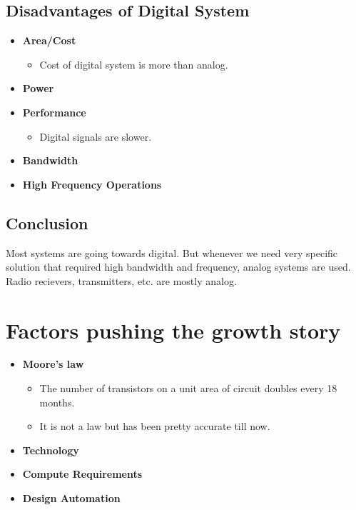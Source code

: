 \documentclass[oneside]{book}
\begin{document}
\subsection{Disadvantages of Digital System}
\begin{itemize}
	\item \textbf{Area/Cost}
	      \begin{itemize}
		      \item Cost of digital system is more than analog.
	      \end{itemize}
	\item \textbf{Power}
	\item \textbf{Performance}
	      \begin{itemize}
		      \item Digital signals are slower.
	      \end{itemize}
	\item \textbf{Bandwidth}
	\item \textbf{High Frequency Operations}
\end{itemize}

\subsection{Conclusion}
Most systems are going towards digital. But whenever we need very specific solution that required high bandwidth and frequency, analog systems are used. Radio recievers, transmitters, etc. are mostly analog.

\section{Factors pushing the growth story}
\begin{itemize}
	\item \textbf{Moore's law}
	      \begin{itemize}
		      \item The number of transistors on a unit area of circuit doubles every 18 months.
		      \item It is not a law but has been pretty accurate till now.
	      \end{itemize}
	\item \textbf{Technology}
	\item \textbf{Compute Requirements}
	\item \textbf{Design Automation}
\end{itemize}
\end{document}
